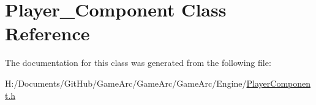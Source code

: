\hypertarget{class_player___component}{\section{Player\+\_\+\+Component Class Reference}
\label{class_player___component}
}


The documentation for this class was generated from the following file\+:\begin{DoxyCompactItemize}
\item 
H\+:/\+Documents/\+Git\+Hub/\+Game\+Arc/\+Game\+Arc/\+Game\+Arc/\+Engine/\hyperlink{_player_component_8h}{Player\+Component.\+h}\end{DoxyCompactItemize}
